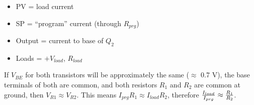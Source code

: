 





\begin{itemize}
\item{} PV = load current
\item{} SP = ``program'' current (through $R_{prg}$)
\item{} Output = current to base of $Q_2$
\item{} Loads = $+V_{load}$, $R_{load}$
\end{itemize}

\vskip 10pt

If $V_{BE}$ for both transistors will be approximately the same ($\approx$ 0.7 V), the base terminals of both are common, and both resistors $R_1$ and $R_2$ are common at ground, then $V_{R1} \approx V_{R2}$.  This means $I_{prg} R_1 \approx I_{load} R_2$, therefore ${I_{load} \over I_{prg}} \approx {R_1 \over R_2}$.











